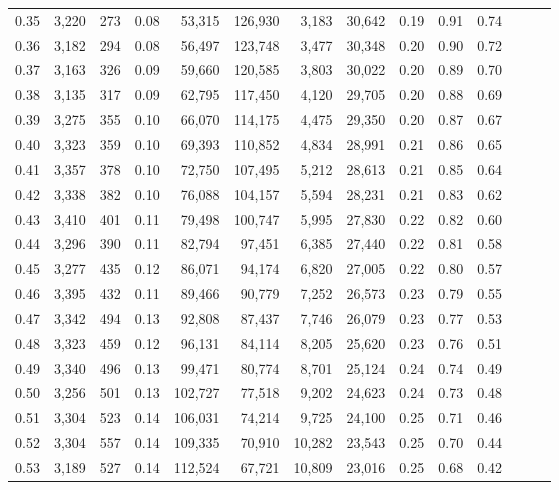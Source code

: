 \begin{tabular}{rrrrrrrrrrrrrr}
0.35 &  3,220 &  273 &  0.08 &   53,315 &  126,930 &   3,183 &  30,642 &  0.19 &  0.91 &      0.74 \\
0.36 &  3,182 &  294 &  0.08 &   56,497 &  123,748 &   3,477 &  30,348 &  0.20 &  0.90 &      0.72 \\
0.37 &  3,163 &  326 &  0.09 &   59,660 &  120,585 &   3,803 &  30,022 &  0.20 &  0.89 &      0.70 \\
0.38 &  3,135 &  317 &  0.09 &   62,795 &  117,450 &   4,120 &  29,705 &  0.20 &  0.88 &      0.69 \\
0.39 &  3,275 &  355 &  0.10 &   66,070 &  114,175 &   4,475 &  29,350 &  0.20 &  0.87 &      0.67 \\
0.40 &  3,323 &  359 &  0.10 &   69,393 &  110,852 &   4,834 &  28,991 &  0.21 &  0.86 &      0.65 \\
0.41 &  3,357 &  378 &  0.10 &   72,750 &  107,495 &   5,212 &  28,613 &  0.21 &  0.85 &      0.64 \\
0.42 &  3,338 &  382 &  0.10 &   76,088 &  104,157 &   5,594 &  28,231 &  0.21 &  0.83 &      0.62 \\
0.43 &  3,410 &  401 &  0.11 &   79,498 &  100,747 &   5,995 &  27,830 &  0.22 &  0.82 &      0.60 \\
0.44 &  3,296 &  390 &  0.11 &   82,794 &   97,451 &   6,385 &  27,440 &  0.22 &  0.81 &      0.58 \\
0.45 &  3,277 &  435 &  0.12 &   86,071 &   94,174 &   6,820 &  27,005 &  0.22 &  0.80 &      0.57 \\
0.46 &  3,395 &  432 &  0.11 &   89,466 &   90,779 &   7,252 &  26,573 &  0.23 &  0.79 &      0.55 \\
0.47 &  3,342 &  494 &  0.13 &   92,808 &   87,437 &   7,746 &  26,079 &  0.23 &  0.77 &      0.53 \\
0.48 &  3,323 &  459 &  0.12 &   96,131 &   84,114 &   8,205 &  25,620 &  0.23 &  0.76 &      0.51 \\
0.49 &  3,340 &  496 &  0.13 &   99,471 &   80,774 &   8,701 &  25,124 &  0.24 &  0.74 &      0.49 \\
0.50 &  3,256 &  501 &  0.13 &  102,727 &   77,518 &   9,202 &  24,623 &  0.24 &  0.73 &      0.48 \\
0.51 &  3,304 &  523 &  0.14 &  106,031 &   74,214 &   9,725 &  24,100 &  0.25 &  0.71 &      0.46 \\
0.52 &  3,304 &  557 &  0.14 &  109,335 &   70,910 &  10,282 &  23,543 &  0.25 &  0.70 &      0.44 \\
0.53 &  3,189 &  527 &  0.14 &  112,524 &   67,721 &  10,809 &  23,016 &  0.25 &  0.68 &      0.42 \\

\end{tabular}
